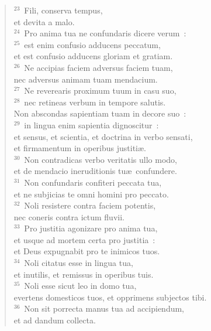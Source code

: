 \begin{flushleft}\begin{verse}${}^{23}$~Fili, conserva tempus,\\ et devita a malo.\\
${}^{24}$~Pro anima tua ne confundaris dicere verum~:\\
${}^{25}$~est enim confusio adducens peccatum,\\ et est confusio adducens gloriam et gratiam.\\
${}^{26}$~Ne accipias faciem adversus faciem tuam,\\ nec adversus animam tuam mendacium.\\
${}^{27}$~Ne reverearis proximum tuum in casu suo,\\
${}^{28}$~nec retineas verbum in tempore salutis.\\ Non abscondas sapientiam tuam in decore suo~:\\
${}^{29}$~in lingua enim sapientia dignoscitur~:\\ et sensus, et scientia, et doctrina in verbo sensati,\\ et firmamentum in operibus justiti\ae .\\
${}^{30}$~Non contradicas verbo veritatis ullo modo,\\ et de mendacio ineruditionis tu\ae\ confundere.\\
${}^{31}$~Non confundaris confiteri peccata tua,\\ et ne subjicias te omni homini pro peccato.\\
${}^{32}$~Noli resistere contra faciem potentis,\\ nec coneris contra ictum fluvii.\\
${}^{33}$~Pro justitia agonizare pro anima tua,\\ et usque ad mortem certa pro justitia~:\\ et Deus expugnabit pro te inimicos tuos.\\
${}^{34}$~Noli citatus esse in lingua tua,\\ et inutilis, et remissus in operibus tuis.\\
${}^{35}$~Noli esse sicut leo in domo tua,\\ evertens domesticos tuos, et opprimens subjectos tibi.\\
${}^{36}$~Non sit porrecta manus tua ad accipiendum,\\ et ad dandum collecta.\end{verse}\end{flushleft}


